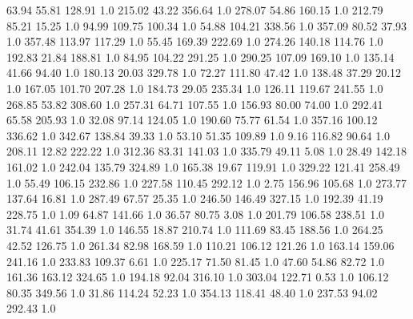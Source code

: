      63.94     55.81    128.91  1.0
    215.02     43.22    356.64  1.0
    278.07     54.86    160.15  1.0
    212.79     85.21     15.25  1.0
     94.99    109.75    100.34  1.0
     54.88    104.21    338.56  1.0
    357.09     80.52     37.93  1.0
    357.48    113.97    117.29  1.0
     55.45    169.39    222.69  1.0
    274.26    140.18    114.76  1.0
    192.83     21.84    188.81  1.0
     84.95    104.22    291.25  1.0
    290.25    107.09    169.10  1.0
    135.14     41.66     94.40  1.0
    180.13     20.03    329.78  1.0
     72.27    111.80     47.42  1.0
    138.48     37.29     20.12  1.0
    167.05    101.70    207.28  1.0
    184.73     29.05    235.34  1.0
    126.11    119.67    241.55  1.0
    268.85     53.82    308.60  1.0
    257.31     64.71    107.55  1.0
    156.93     80.00     74.00  1.0
    292.41     65.58    205.93  1.0
     32.08     97.14    124.05  1.0
    190.60     75.77     61.54  1.0
    357.16    100.12    336.62  1.0
    342.67    138.84     39.33  1.0
     53.10     51.35    109.89  1.0
      9.16    116.82     90.64  1.0
    208.11     12.82    222.22  1.0
    312.36     83.31    141.03  1.0
    335.79     49.11      5.08  1.0
     28.49    142.18    161.02  1.0
    242.04    135.79    324.89  1.0
    165.38     19.67    119.91  1.0
    329.22    121.41    258.49  1.0
     55.49    106.15    232.86  1.0
    227.58    110.45    292.12  1.0
      2.75    156.96    105.68  1.0
    273.77    137.64     16.81  1.0
    287.49     67.57     25.35  1.0
    246.50    146.49    327.15  1.0
    192.39     41.19    228.75  1.0
      1.09     64.87    141.66  1.0
     36.57     80.75      3.08  1.0
    201.79    106.58    238.51  1.0
     31.74     41.61    354.39  1.0
    146.55     18.87    210.74  1.0
    111.69     83.45    188.56  1.0
    264.25     42.52    126.75  1.0
    261.34     82.98    168.59  1.0
    110.21    106.12    121.26  1.0
    163.14    159.06    241.16  1.0
    233.83    109.37      6.61  1.0
    225.17     71.50     81.45  1.0
     47.60     54.86     82.72  1.0
    161.36    163.12    324.65  1.0
    194.18     92.04    316.10  1.0
    303.04    122.71      0.53  1.0
    106.12     80.35    349.56  1.0
     31.86    114.24     52.23  1.0
    354.13    118.41     48.40  1.0
    237.53     94.02    292.43  1.0
